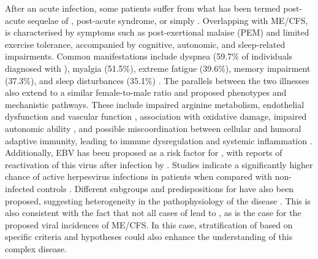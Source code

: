After an acute \sars infection, some patients suffer from what has been termed post-acute sequelae of \sars, post-acute \covid syndrome, or simply \LC \citep{choutka2022UnexplainedPostacute}.
Overlapping with ME/CFS, \LC is characterised by symptoms such as post-exertional malaise (PEM) and limited exercise tolerance, accompanied by cognitive, autonomic, and sleep-related impairments.
Common manifestations include dyspnea (59.7\% of individuals diagnosed with \LC), myalgia (51.5\%), extreme fatigue (39.6\%), memory impairment (37.3\%), and sleep disturbances (35.1\%) \citep{logue2021SequelaeAdults, sykes2021PostCOVID19Symptom}.
The parallels between the two illnesses also extend to a similar female-to-male ratio \citep{jacobsen2021SexDifferences} and proposed phenotypes and mechanistic pathways.
These include impaired arginine metabolism, endothelial dysfunction and vascular function \citep{mclaughlin2023PeopleLong}, association with oxidative damage, impaired autonomic ability \citep{hayes2023PeopleLong}, and possible miscoordination between cellular and humoral adaptive immunity, leading to immune dysregulation and systemic inflammation \citep{komaroff2021InsightsMyalgic, komaroffWillCOVID19Lead2021, al-hakeim2023LongCOVIDPostviral, yin2024LongCOVID}.
Additionally, EBV has been proposed as a risk factor for \LC, with reports of reactivation of this virus after infection by \sars.
Studies indicate a significantly higher chance of active herpesvirus infections in \LC patients when compared with non-infected controls \citep{su2022MultipleEarly, bernal2023IncidenceEpsteinBarr, banko2023SystematicReview}.
Different subgroups and predispositions for \LC have also been proposed, suggesting heterogeneity in the pathophysiology of the disease \citep{zhang2023DatadrivenIdentification}.
This is also consistent with the fact that not all cases of \covid lead to \LC, as is the case for the proposed viral incidences of ME/CFS.
In this case, stratification of \LC based on specific criteria and hypotheses could also enhance the understanding of this complex disease.

